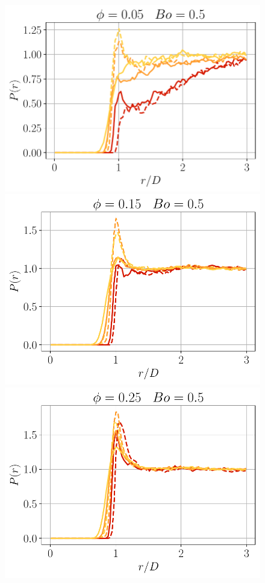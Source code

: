 \begin{figure}[h!]
    \centering
    \includegraphics[height=0.15\textheight]{image/N_10/radial/probarBo0_5PHI0_05.pdf}
    \includegraphics[height=0.15\textheight]{image/N_10/radial/probarBo0_5PHI0_15.pdf}
    \includegraphics[height=0.15\textheight]{image/N_10/radial/probarBo0_5PHI0_25.pdf}

\end{figure}
